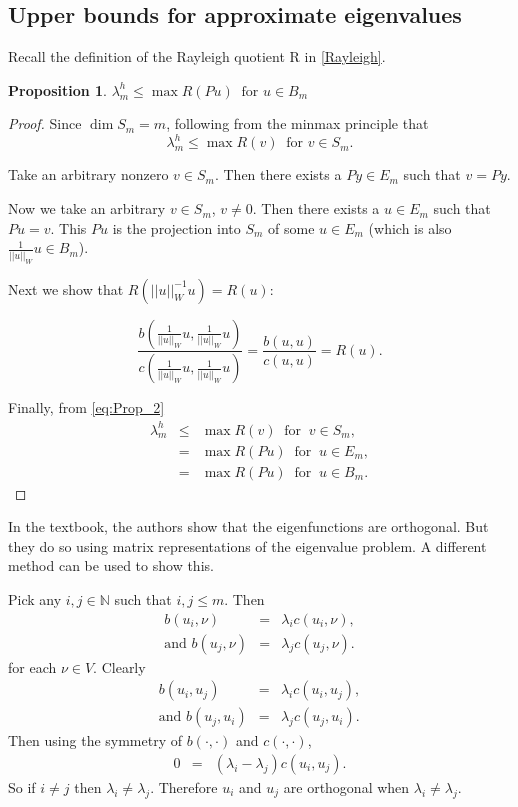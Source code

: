 \documentclass[../../main.tex]{subfiles}
\begin{document}
\subsection{Upper bounds for approximate eigenvalues}

 Recall the definition of the Rayleigh quotient R in \eqref{Rayleigh}.

\newtheorem{Prop_2}[Prop_1]{Proposition}
\begin{Prop_2}
	\label{Prop_2}
	$\lambda^{h}_{m} \leq \max R(Pu) \ \text{ for } u \in B_{m}$
\end{Prop_2}
\begin{proof}
	Since $\dim S_{m} = m$, following from the minmax principle that
	\begin{equation}
		\lambda_m^h \leq \max R(v) \ \text{ for } v \in S_m. \label{eq:Prop_2}
	\end{equation}

	Take an arbitrary nonzero $v \in S_m$. Then there exists a $Py \in E_m$ such that $v = Py$.
 
	Now we take an arbitrary $v \in S_{m}$, $v \neq 0$. Then there exists a $u \in E_{m}$ such that $Pu = v$. This $Pu$ is the projection into $S_m$ of some $u \in E_m$ (which is also $\displaystyle \frac{1}{||u||_{W}}u \in B_m$).
	
	Next we show that $R(||u||_{W}^{-1}u) = R(u)$:

	\[ \frac{b\left(\frac{1}{||u||_{W}}u,\frac{1}{||u||_{W}}u\right)}{c\left(\frac{1}{||u||_{W}}u,\frac{1}{||u||_{W}}u\right)} = \frac{b(u,u)}{c(u,u)} = R(u). \]

	Finally, from \eqref{eq:Prop_2}
	\begin{eqnarray*}
	\lambda_{m}^{h} &\leq & \max R(v) \ \text{ for } \ v \in S_{m},\\
						&=& \max R(Pu) \ \text{ for } \ u \in E_{m},\\
						&=& \max R(Pu) \ \text{ for } \ u \in B_{m}.
	\end{eqnarray*}
\end{proof}

In the textbook, the authors show that the eigenfunctions are orthogonal. But they do so using matrix representations of the eigenvalue problem. A different method can be used to show this.

Pick any $i,j \in \mathbb{N}$ such that $i,j \leq m$. Then
\begin{eqnarray*}
	b(u_{i},\nu) &=& \lambda_{i}c(u_{i},\nu),\\
	\textrm{and } b(u_{j},\nu) &=& \lambda_{j}c(u_{j},\nu).
\end{eqnarray*}
for each $\nu \in V$. Clearly
\begin{eqnarray*}
	b(u_{i},u_{j}) &=& \lambda_{i}c(u_{i},u_{j}),\\
	\textrm{and } b(u_{j},u_{i}) &=& \lambda_{j}c(u_{j},u_{i}).
\end{eqnarray*}
Then using the symmetry of $b(\cdot,\cdot)$ and $c( \cdot, \cdot )$,
\begin{eqnarray*}
	0 &=& (\lambda_{i} - \lambda_{j}) c( u_{i}, u_{j} ).
\end{eqnarray*}
So if $i \neq j$ then $\lambda_{i} \neq \lambda_{j}$. Therefore $u_{i}$ and $u_{j}$ are orthogonal when $\lambda_i \neq \lambda_j$.
\end{document}

